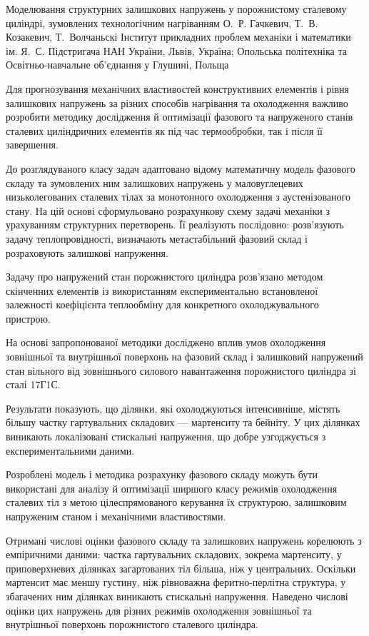 \ReportHeading
  {Моделювання структурних залишкових напружень у порожнистому сталевому циліндрі, зумовлених технологічним нагріванням}
  {О.~Р. Гачкевич, Т.~В. Козакевич, Т.~Волчаньскі}
  {Інститут прикладних проблем механіки і математики ім. Я.~С. Підстригача НАН України, Львів, Україна; Опольська політехніка та Освітньо-навчальне об’єднання у Глушині, Польща}
  {}

Для прогнозування механічних властивостей конструктивних елементів і рівня залишкових напружень за різних способів нагрівання та охолодження важливо розробити методику дослідження й оптимізації фазового та напруженого станів сталевих циліндричних елементів як під час термообробки, так і після її завершення.

До розглядуваного класу задач адаптовано відому математичну модель фазового складу та зумовлених ним залишкових напружень у маловуглецевих низьколегованих сталевих тілах за монотонного охолодження з аустенізованого стану. На цій основі сформульовано розрахункову схему задачі механіки з урахуванням структурних перетворень. Її реалізують послідовно: розв’язують задачу теплопровідності, визначають метастабільний фазовий склад і розраховують залишкові напруження.

Задачу про напружений стан порожнистого циліндра розв’язано методом скінченних елементів із використанням експериментально встановленої залежності коефіцієнта теплообміну для конкретного охолоджувального пристрою.

На основі запропонованої методики досліджено вплив умов охолодження зовнішньої та внутрішньої поверхонь на фазовий склад і залишковий напружений стан вільного від зовнішнього силового навантаження порожнистого циліндра зі сталі 17Г1С.

Результати показують, що ділянки, які охолоджуються інтенсивніше, містять більшу частку гартувальних складових --- мартенситу та бейніту. У цих ділянках виникають локалізовані стискальні напруження, що добре узгоджується з експериментальними даними.

Розроблені модель і методика розрахунку фазового складу можуть бути використані для аналізу й оптимізації ширшого класу режимів охолодження сталевих тіл з метою цілеспрямованого керування їх структурою, залишковим напруженим станом і механічними властивостями.

Отримані числові оцінки фазового складу та залишкових напружень корелюють з емпіричними даними: частка гартувальних складових, зокрема мартенситу, у приповерхневих ділянках загартованих тіл більша, ніж у центральних. Оскільки мартенсит має меншу густину, ніж рівноважна феритно-перлітна структура, у збагачених ним ділянках виникають стискальні напруження. Наведено числові оцінки цих напружень для різних режимів охолодження зовнішньої та внутрішньої поверхонь порожнистого сталевого циліндра.

